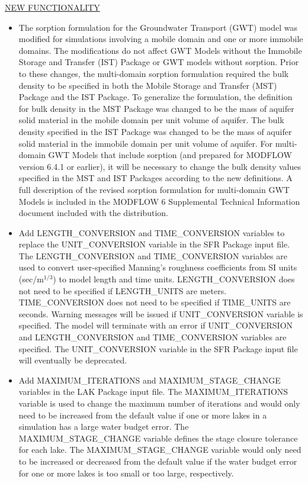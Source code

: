 	
	\item \currentmodflowversion
	
	\underline{NEW FUNCTIONALITY}
	\begin{itemize}
		\item The sorption formulation for the Groundwater Transport (GWT) model was modified for simulations involving a mobile domain and one or more immobile domains.  The modifications do not affect GWT Models without the Immobile Storage and Transfer (IST) Package or GWT models without sorption.  Prior to these changes, the multi-domain sorption formulation required the bulk density to be specified in both the Mobile Storage and Transfer (MST) Package and the IST Package.  To generalize the formulation, the definition for bulk density in the MST Package was changed to be the mass of aquifer solid material in the mobile domain per unit volume of aquifer.  The bulk density specified in the IST Package was changed to be the mass of aquifer solid material in the immobile domain per unit volume of aquifer.  For multi-domain GWT Models that include sorption (and prepared for MODFLOW version 6.4.1 or earlier), it will be necessary to change the bulk density values specified in the MST and IST Packages according to the new definitions.  A full description of the revised sorption formulation for multi-domain GWT Models is included in the MODFLOW 6 Supplemental Technical Information document included with the distribution.
		\item Add LENGTH\_CONVERSION and TIME\_CONVERSION variables to replace the UNIT\_CONVERSION variable in the SFR Package input file. The LENGTH\_CONVERSION and TIME\_CONVERSION variables are used to convert user-specified Manning's roughness coefficients from SI units (sec/m$^{1/3}$) to model length and time units. LENGTH\_CONVERSION does not need to be specified if LENGTH\_UNITS are meters. TIME\_CONVERSION does not need to be specified if TIME\_UNITS are seconds. Warning messages will be issued if UNIT\_CONVERSION variable is specified. The model will terminate with an error if UNIT\_CONVERSION and LENGTH\_CONVERSION and TIME\_CONVERSION variables are specified. The UNIT\_CONVERSION variable in the SFR Package input file will eventually be deprecated. 
		\item Add MAXIMUM\_ITERATIONS and MAXIMUM\_STAGE\_CHANGE variables in the LAK Package input file. The MAXIMUM\_ITERATIONS variable is used to change the maximum number of iterations and would only need to be increased from the default value if one or more lakes in a simulation has a large water budget error.  The MAXIMUM\_STAGE\_CHANGE variable defines the stage closure tolerance for each lake. The MAXIMUM\_STAGE\_CHANGE variable would only need to be increased or decreased from the default value if the water budget error for one or more lakes is too small or too large, respectively. 
	\end{itemize}

